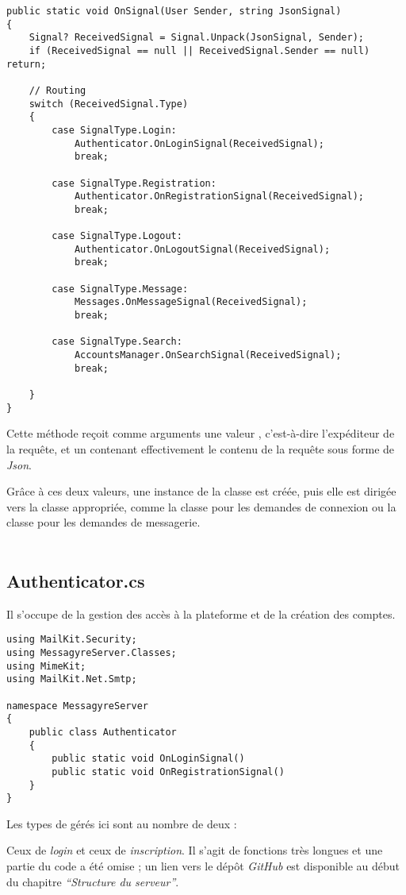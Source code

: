 \documentclass{article}
\begin{document}
\begin{verbatim}
public static void OnSignal(User Sender, string JsonSignal)
{
	Signal? ReceivedSignal = Signal.Unpack(JsonSignal, Sender);
	if (ReceivedSignal == null || ReceivedSignal.Sender == null) return;

	// Routing
	switch (ReceivedSignal.Type)
	{
		case SignalType.Login:
			Authenticator.OnLoginSignal(ReceivedSignal);
			break;

		case SignalType.Registration:
			Authenticator.OnRegistrationSignal(ReceivedSignal);
			break;

		case SignalType.Logout:
			Authenticator.OnLogoutSignal(ReceivedSignal);
			break;

		case SignalType.Message:
			Messages.OnMessageSignal(ReceivedSignal);
			break;

		case SignalType.Search:
			AccountsManager.OnSearchSignal(ReceivedSignal);
			break;

	}
}
\end{verbatim}

Cette méthode reçoit comme arguments une valeur , c'est-à-dire l'expéditeur de la requête, et un  contenant effectivement le contenu de la requête sous forme de \textit{Json}.

Grâce à ces deux valeurs, une instance de la classe  est créée, puis elle est dirigée vers la classe appropriée, comme la classe  pour les demandes de connexion ou la classe  pour les demandes de messagerie.
\\\\
\subsection{Authenticator.cs}

Il s’occupe de la gestion des accès à la plateforme et de la création des comptes.

\begin{verbatim}
using MailKit.Security;
using MessagyreServer.Classes;
using MimeKit;
using MailKit.Net.Smtp;

namespace MessagyreServer
{
	public class Authenticator
	{
		public static void OnLoginSignal()
		public static void OnRegistrationSignal()
	}
}
\end{verbatim}

Les types de  gérés ici sont au nombre de deux : 

Ceux de \textit{login} et ceux de \textit{inscription}. Il s'agit de fonctions très longues et une partie du code a été omise ; un lien vers le dépôt \textit{GitHub} est disponible au début du chapitre \textit{“Structure du serveur”}.
\end{document}
